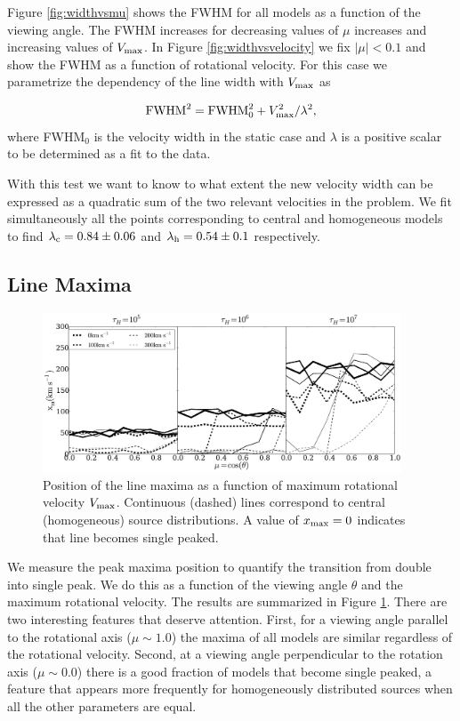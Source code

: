 \documentclass{emulateapj}
\begin{document}
Figure \ref{fig:widthvsmu} shows the FWHM for all models as a function
of the viewing angle. The FWHM increases for decreasing values of
$\mu$ increases and increasing values of $V_{\rm max}$. In Figure
\ref{fig:widthvsvelocity} we fix $|\mu|<0.1$ and show the FWHM as a
function of rotational velocity. For this case we parametrize the
dependency of the line width with  $V_{\rm max}$ as

\begin{equation}
 {\rm FWHM}^2 = {\rm FWHM}_{0}^2 + V_{\rm max}^2/\lambda^2,
\label{eq:fwhm}
\end{equation}
%
where FWHM$_{0}$ is the velocity width in the static case and $\lambda$ 
is a positive scalar to be determined as a fit to the data. 

With this test we want to know to what extent the new velocity width
can be expressed as a quadratic sum of the two relevant velocities in
the problem. We fit simultaneously all the points corresponding to
central and homogeneous models to find $\lambda_{\rm c} = 0.84 \pm
0.06$ and $\lambda_{\rm h}= 0.54\pm 0.1$ respectively. 


\subsection{Line Maxima}
\label{sec:maxima}

\begin{figure}
\begin{center}
  \includegraphics[width=0.95\textwidth]{f8.pdf}
\end{center}
\caption{Position of the line maxima as a function of maximum
  rotational   velocity $V_{\rm max}$. Continuous (dashed) lines
  correspond to   central (homogeneous) source distributions. A value
  of $x_{\rm     max}=0$ indicates that line becomes single
  peaked. \label{fig:maximumsvsvelocity}}
\end{figure}

We measure the peak maxima position to quantify the transition from
double into single peak. We do this as a function of the viewing angle
$\theta$ and the maximum rotational velocity. The results are
summarized in Figure  \ref{fig:maximumsvsvelocity}. There are two
interesting features that deserve attention. First, for a viewing angle
parallel to the rotational axis ($\mu\sim 1.0$) the maxima of all
models are similar regardless of the rotational velocity. Second, at a
viewing angle perpendicular to the rotation axis ($\mu\sim 0.0$) there
is a good fraction of models that become single peaked, a feature that
appears more frequently for homogeneously distributed sources when all
the other parameters are equal.
\end{document}
